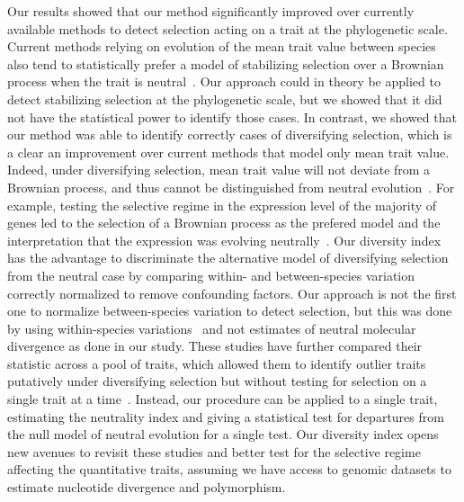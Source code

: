 \documentclass{article}
\begin{document}
Our results showed that our method significantly improved over currently available methods to detect selection acting on a trait at the phylogenetic scale.
Current methods relying on evolution of the mean trait value between species also tend to statistically prefer a model of stabilizing selection over a Brownian process when the trait is neutral~\parencite{silvestro_measurement_2015, cooper_cautionary_2016, price_detecting_2022}.
Our approach could in theory be applied to detect stabilizing selection at the phylogenetic scale, but we showed that it did not have the statistical power to identify those cases.
In contrast, we showed that our method was able to identify correctly cases of diversifying selection, which is a clear an improvement over current methods that model only mean trait value.
Indeed, under diversifying selection, mean trait value will not deviate from a Brownian process, and thus cannot be distinguished from neutral evolution~\parencite{hansen_translating_1996, harmon_phylogenetic_2018}.
For example, testing the selective regime in the expression level of the majority of genes led to the selection of a Brownian process as the prefered model and the interpretation that the expression was evolving neutrally~\parencite{catalan_drift_2019}.
Our diversity index has the advantage to discriminate the alternative model of diversifying selection from the neutral case by comparing within- and between-species variation correctly normalized to remove confounding factors.
Our approach is not the first one to normalize between-species variation to detect selection, but this was done by using within-species variations~\parencite{rohlfs_modeling_2014, rohlfs_phylogenetic_2015} and not estimates of neutral molecular divergence as done in our study.
These studies have further compared their statistic across a pool of traits, which allowed them to identify outlier traits putatively under diversifying selection but without testing for selection on a single trait at a time~\parencite{rohlfs_phylogenetic_2015, gillard_comparative_2021}.
Instead, our procedure can be applied to a single trait, estimating the neutrality index and giving a statistical test for departures from the null model of neutral evolution for a single test.
Our diversity index opens new avenues to revisit these studies and better test for the selective regime affecting the quantitative traits, assuming we have access to genomic datasets to estimate nucleotide divergence and polymorphism.
\end{document}

